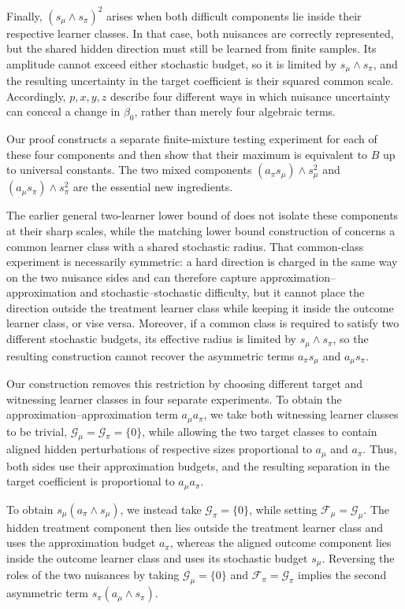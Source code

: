 \documentclass[11pt]{article}
\begin{document}
Finally,
$(s_\mu\wedge s_\pi)^2$ arises when both difficult components lie inside their respective learner
classes.  In that case, both nuisances are correctly represented, but the
shared hidden direction must still be learned from finite samples.  Its
amplitude cannot exceed either stochastic budget, so it is limited by
\(s_\mu\wedge s_\pi\), and the resulting uncertainty in the target coefficient
is their squared common scale.  Accordingly, \(p,x,y,z\) describe four
different ways in which nuisance uncertainty can conceal a change in
\(\beta_0\), rather than merely four algebraic terms.

Our proof constructs a separate finite-mixture testing experiment
for each of these four components and then show that their maximum is equivalent to \(B\) up to universal
constants. The two mixed components \((a_\pi s_\mu)\wedge s_\mu^2\) and \((a_\mu s_\pi)\wedge s_\pi^2\) are the essential
new ingredients. 

The earlier general two-learner lower bound of
\citet{gu2026taming} does not isolate these components at their sharp scales,
while the matching lower bound construction of \citet{gu2026optimal} concerns
a common learner class with a shared stochastic radius.  That common-class
experiment is necessarily symmetric: a hard direction is charged in the same
way on the two nuisance sides and can therefore capture
approximation–approximation and stochastic–stochastic difficulty, but it
cannot place the direction outside the treatment learner class while keeping
it inside the outcome learner class, or vise versa.  Moreover, if a common
class is required to satisfy two different stochastic budgets, its effective
radius is limited by \(s_\mu\wedge s_\pi\), so the resulting construction
cannot recover the asymmetric terms \(a_\pi s_\mu\) and \(a_\mu s_\pi\).

Our construction removes this restriction by choosing different target and
witnessing learner classes in four separate experiments.  To obtain the
approximation--approximation term \(a_\mu a_\pi\), we take both witnessing
learner classes to be trivial, $\mathcal G_\mu=\mathcal G_\pi=\{0\}$, while allowing the two target classes to contain aligned hidden perturbations
of respective sizes proportional to \(a_\mu\) and \(a_\pi\).  Thus, both sides
use their approximation budgets, and the resulting separation in the target
coefficient is proportional to \(a_\mu a_\pi\).

To obtain $s_\mu(a_\pi\wedge s_\mu)$, we instead take \(\mathcal G_\pi=\{0\}\), while setting
\(\mathcal F_\mu=\mathcal G_\mu\).  The hidden treatment component then lies
outside the treatment learner class and uses the approximation budget
\(a_\pi\), whereas the aligned outcome component lies inside the outcome
learner class and uses its stochastic budget \(s_\mu\).  Reversing the roles
of the two nuisances by taking \(\mathcal G_\mu=\{0\}\) and
\(\mathcal F_\pi=\mathcal G_\pi\) implies the second asymmetric term $s_\pi(a_\mu\wedge s_\pi)$.
\end{document}
